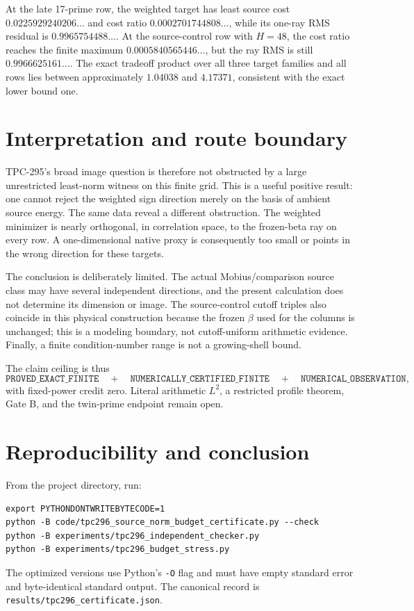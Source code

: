 \documentclass[10pt]{article}
\begin{document}
At the late 17-prime row, the weighted target has least source cost
$0.0225929240206\ldots$ and cost ratio
$0.0002701744808\ldots$, while its one-ray RMS residual is
$0.9965754488\ldots$.  At the source-control row with $H=48$, the cost
ratio reaches the finite maximum $0.0005840565446\ldots$, but the ray RMS
is still $0.9966625161\ldots$.  The exact tradeoff product over all three
target families and all rows lies between approximately $1.04038$ and
$4.17371$, consistent with the exact lower bound one.

\section{Interpretation and route boundary}

TPC-295's broad image question is therefore not obstructed by a large
unrestricted least-norm witness on this finite grid.  This is a useful
positive result: one cannot reject the weighted sign direction merely on
the basis of ambient source energy.  The same data reveal a different
obstruction.  The weighted minimizer is nearly orthogonal, in correlation
space, to the frozen-beta ray on every row.  A one-dimensional native proxy
is consequently too small or points in the wrong direction for these
targets.

The conclusion is deliberately limited.  The actual Mobius/comparison
source class may have several independent directions, and the present
calculation does not determine its dimension or image.  The source-control
cutoff triples also coincide in this physical construction because the
frozen $\beta$ used for the columns is unchanged; this is a modeling
boundary, not cutoff-uniform arithmetic evidence.  Finally, a finite
condition-number range is not a growing-shell bound.

The claim ceiling is thus
\[
\texttt{PROVED\_EXACT\_FINITE}\quad+\quad
\texttt{NUMERICALLY\_CERTIFIED\_FINITE}\quad+\quad
\texttt{NUMERICAL\_OBSERVATION},
\]
with fixed-power credit zero.  Literal arithmetic $L^2$, a restricted
profile theorem, Gate B, and the twin-prime endpoint remain open.

\section{Reproducibility and conclusion}

From the project directory, run:
\begin{verbatim}
export PYTHONDONTWRITEBYTECODE=1
python -B code/tpc296_source_norm_budget_certificate.py --check
python -B experiments/tpc296_independent_checker.py
python -B experiments/tpc296_budget_stress.py
\end{verbatim}
The optimized versions use Python's \texttt{-O} flag and must have empty
standard error and byte-identical standard output.  The canonical record is
\texttt{results/tpc296\_certificate.json}.
\end{document}
